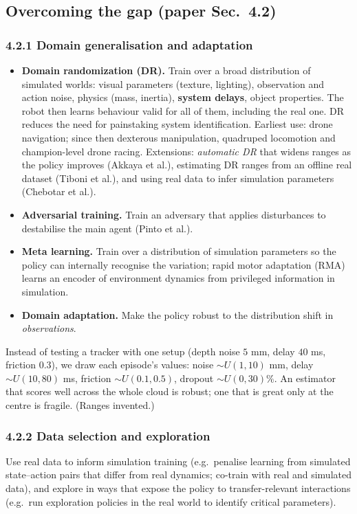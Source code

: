 \documentclass[11pt,a4paper]{article}
\begin{document}
\subsection{Overcoming the gap \textnormal{(paper Sec.~4.2)}}

\subsubsection*{4.2.1 Domain generalisation and adaptation}
\begin{itemize}
\item \textbf{Domain randomization (DR).} Train over a broad distribution of simulated worlds:
visual parameters (texture, lighting), observation and action noise, physics (mass, inertia),
\textbf{system delays}, object properties. The robot then learns behaviour valid for all of them,
including the real one. DR reduces the need for painstaking system identification. Earliest use:
drone navigation; since then dexterous manipulation, quadruped locomotion and champion-level drone
racing. Extensions: \emph{automatic DR} that widens ranges as the policy improves (Akkaya et al.),
estimating DR ranges from an offline real dataset (Tiboni et al.), and using real data to infer
simulation parameters (Chebotar et al.).
\item \textbf{Adversarial training.} Train an adversary that applies disturbances to destabilise
the main agent (Pinto et al.).
\item \textbf{Meta learning.} Train over a distribution of simulation parameters so the policy can
internally recognise the variation; rapid motor adaptation (RMA) learns an encoder of environment
dynamics from privileged information in simulation.
\item \textbf{Domain adaptation.} Make the policy robust to the distribution shift in
\emph{observations}.
\end{itemize}

\begin{toy}
Instead of testing a tracker with one setup (depth noise $5$ mm, delay $40$ ms, friction $0.3$),
we draw each episode's values: noise $\sim U(1,10)$ mm, delay $\sim U(10,80)$ ms, friction
$\sim U(0.1,0.5)$, dropout $\sim U(0,30)\%$. An estimator that scores well across the whole cloud
is robust; one that is great only at the centre is fragile. (Ranges invented.)
\end{toy}

\subsubsection*{4.2.2 Data selection and exploration}
Use real data to inform simulation training (e.g.\ penalise learning from simulated state--action
pairs that differ from real dynamics; co-train with real and simulated data), and explore in ways
that expose the policy to transfer-relevant interactions (e.g.\ run exploration policies in the
real world to identify critical parameters).
\end{document}
